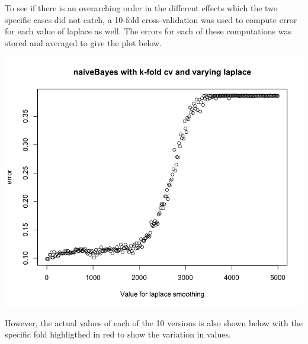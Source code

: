 \documentclass[11pt]{article}
\begin{document}
\begin{enumerate}
To see if there is an overarching order in the different effects which the two specific cases did not 
catch, a 10-fold cross-validation was used to compute error for each value of laplace as well. 
The errors for each of these computations was stored and averaged to give the plot below. 

\begin{center}
\includegraphics[scale=0.35]{pix/10fold_cv}
\end{center}

However, the actual values of each of the 10 versions is also shown below with the specific fold 
highligthed in red to show the variation in values. 


\end{enumerate}
\end{document}
